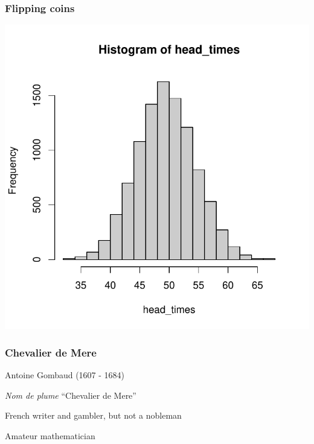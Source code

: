 \documentclass[12pt]{beamer}\usepackage[]{graphicx}\usepackage[]{color}
\newenvironment{knitrout}{}{} %
\begin{document}
\begin{frame}[fragile]
\frametitle{Flipping coins}

\begin{knitrout}\footnotesize
{}\color{fgcolor}

{\centering \includegraphics[width=.7\linewidth,height=.7\linewidth]{figure/unnamed-chunk-15-1} 

}



\end{knitrout}

\end{frame}


\begin{frame}
\begin{center}
\Huge{}
\end{center}
\end{frame}


\begin{frame}
\frametitle{Chevalier de Mere}

\bbi
  \item Antoine Gombaud (1607 - 1684)
  \item \textit{Nom de plume} ``Chevalier de Mere''
  \item French writer and gambler, but not a nobleman
  \item Amateur mathematician
\ei

\end{frame}
\end{document}
